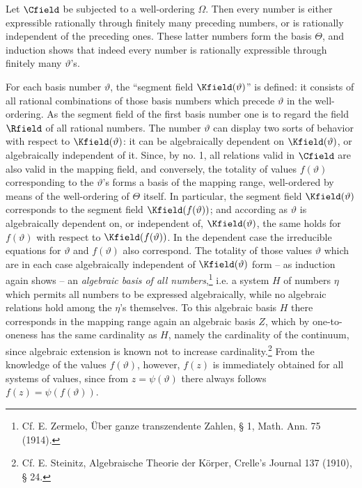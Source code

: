 Let \(\Cfield\) be subjected to a well-ordering \(\Omega\). Then every number is either expressible rationally through finitely many preceding numbers, or is rationally independent of the preceding ones. These latter numbers form the basis \(\Theta\), and induction shows that indeed every number is rationally expressible through finitely many \(\vartheta\)'s.

For each basis number \(\vartheta\), the ``segment field \(\Kfield(\vartheta)\)'' is defined: it consists of all rational combinations of those basis numbers which precede \(\vartheta\) in the well-ordering. As the segment field of the first basis number one is to regard the field \(\Rfield\) of all rational numbers. The number \(\vartheta\) can display two sorts of behavior with respect to \(\Kfield(\vartheta)\): it can be algebraically dependent on \(\Kfield(\vartheta)\), or algebraically independent of it. Since, by no. 1, all relations valid in \(\Cfield\) are also valid in the mapping field, and conversely, the totality of values \(f(\vartheta)\) corresponding to the \(\vartheta\)'s forms a basis of the mapping range, well-ordered by means of the well-ordering of \(\Theta\) itself. In particular, the segment field \(\Kfield(\vartheta)\) corresponds to the segment field \(\Kfield(f(\vartheta))\); and according as \(\vartheta\) is algebraically dependent on, or independent of, \(\Kfield(\vartheta)\), the same holds for \(f(\vartheta)\) with respect to \(\Kfield(f(\vartheta))\). In the dependent case the irreducible equations for \(\vartheta\) and \(f(\vartheta)\) also correspond. The totality of those values \(\vartheta\) which are in each case algebraically independent of \(\Kfield(\vartheta)\) form -- as induction again shows -- an \emph{algebraic basis of all numbers},\footnote{Cf. E. Zermelo, Über ganze transzendente Zahlen, § 1, Math. Ann. 75 (1914).} i.e. a system \(H\) of numbers \(\eta\) which permits all numbers to be expressed algebraically, while no algebraic relations hold among the \(\eta\)'s themselves. To this algebraic basis \(H\) there corresponds in the mapping range again an algebraic basis \(Z\), which by one-to-oneness has the same cardinality as \(H\), namely the cardinality of the continuum, since algebraic extension is known not to increase cardinality.\footnote{Cf. E. Steinitz, Algebraische Theorie der Körper, Crelle's Journal 137 (1910), § 24.} From the knowledge of the values \(f(\vartheta)\), however, \(f(z)\) is immediately obtained for all systems of values, since from \(z=\psi(\vartheta)\) there always follows \(f(z)=\psi(f(\vartheta))\).

